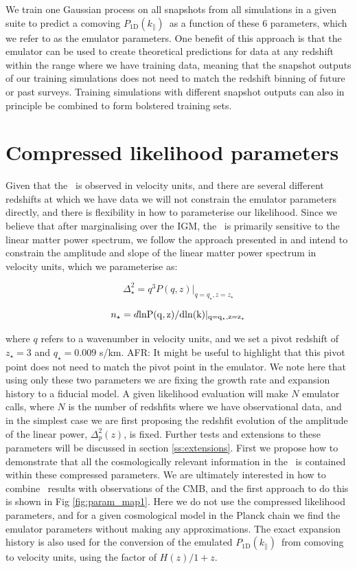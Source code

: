 \documentclass[preprintnumbers,prd,superscriptaddress,notitlepage,nofootinbib] {revtex4-1}
\newcommand{\afr}[1]{{\color{red}AFR: #1}}
\newcommand{\fluxpower}{$P_\mathrm{1D}(k_\parallel)$}
\begin{document}
We train one Gaussian
process on all snapshots from all simulations in a given suite to predict a
comoving \fluxpower\ as a function of these $6$ parameters, which we refer to as the
emulator parameters. One benefit of this approach is that the emulator can be used
to create theoretical predictions for data at any redshift within the range where
we have training data, meaning that the snapshot outputs of our training simulations
does not need to match the redshift binning of future or past surveys.
Training simulations with different snapshot outputs can also in principle be combined
to form bolstered training sets.

\section{Compressed likelihood parameters}
Given that the \lyaf\ is observed in velocity units, and there are several different
redshifts at which we have data we will not constrain the emulator parameters directly,
and there is flexibility in how to parameterise our likelihood. Since we believe that
after marginalising over the IGM, the \lyaf\ is primarily sensitive to the linear
matter power spectrum, we follow the approach presented in \cite{McDonald2005a}
and intend to constrain the amplitude and slope of the linear matter power spectrum
in velocity units, which we parameterise as:

\begin{equation}
    \label{eq:Delta2_star}
    \Delta^2_\star=q^3P(q, z)|_{q=q_\star,z=z_\star}
\end{equation}

\begin{equation}
    \label{eq:n_star}
    n_\star=d\rm{ln}P(q,z) / d \rm{ln}(k)|_{q=q_\star,z=z_\star}
\end{equation}

where $q$ refers to a wavenumber in velocity units, and we set a pivot
redshift of $z_\star=3$ and $q_\star=0.009$ s/km. 
\afr{It might be useful to highlight that this pivot point does not need to match the pivot point
in the emulator.}
We note here that using
only these two parameters we are fixing the growth rate and expansion
history to a fiducial model. A given likelihood evaluation will make $N$ emulator
calls, where $N$ is the number of redshfits where we have observational data, and
in the simplest case we are first proposing the redshfit evolution of the amplitude
of the linear power, $\Delta^2_p(z)$, is fixed.
Further tests and extensions to these
parameters will be discussed in section \ref{ss:extensions}. First we
propose how to demonstrate that all the cosmologically relevant information
in the \lyaf\ is contained within these compressed parameters. We are ultimately
interested in how to combine \lyaf\ results with observations of the CMB, and the
first approach to do this is shown in Fig \ref{fig:param_map1}. Here we do not use
the compressed likelihood parameters, and for a given cosmological model in the Planck
chain we find the emulator parameters without making any approximations. The exact
expansion history is also used for the conversion of the emulated \fluxpower\ from
comoving to velocity units, using the factor of $H(z)/1+z$.
\end{document}
